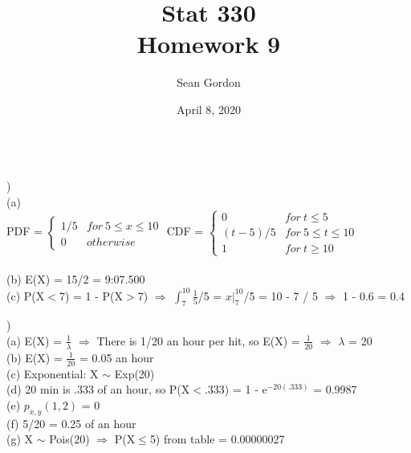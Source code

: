 \documentclass[12pt]{article}
\title{Stat 330\\Homework 9}
\author{Sean Gordon}
\date{April 8, 2020}
\begin{document}
\maketitle


\noindent\hrulefill \\[-.8em]


)\\
\indent (a) \\
\indent \indent PDF =
$
\begin{cases} 
	1/5 & for\ 5 \leq x \leq 10 \\
	0 & otherwise 
\end{cases}
$
\indent \indent CDF = 
$
\begin{cases} 
	0 & for\ t \leq 5\\
	(t - 5)/5 & for\ 5 \leq t \leq 10 \\
	1 & for\ t \ge 10 
\end{cases}
$\\\\

\indent (b) 
E(X) = 15/2 = 9:07.500\\


\indent (c) P(X$<$7) = 1 - P(X$>$7) $\Rightarrow$ {\Large$\int_{7}^{10}\frac{1}{5}$}/5 = $x\Big|_7^{10}$/5 = 10 - 7 / 5 $\Rightarrow$ 1 - 0.6 = 0.4\\


\noindent \hrulefill 


)\\
\indent (a) E(X) = {\Large$\frac{1}{\lambda}$} $\Rightarrow$ There is 1/20 an hour per hit, so E(X) = {\Large$\frac{1}{20}$} $\Rightarrow$ $\lambda$ = 20\\

\indent (b) E(X) = {\Large$\frac{1}{20}$} = 0.05 an hour\\

\indent (c) Exponential: X $\sim$ Exp(20)\\

\indent (d) 20 min is .333 of an hour, so P(X$<$.333) = 1 - e$^{-20(.333)}$ = 0.9987\\

\indent (e) $p_{x, y}(1, 2)$ = 0\\

\indent (f) 5/20 = 0.25 of an hour\\

\indent (g) X $\sim$ Pois(20) $\Rightarrow$ P(X$\leq$5) from table = 0.00000027\\
\end{document}
